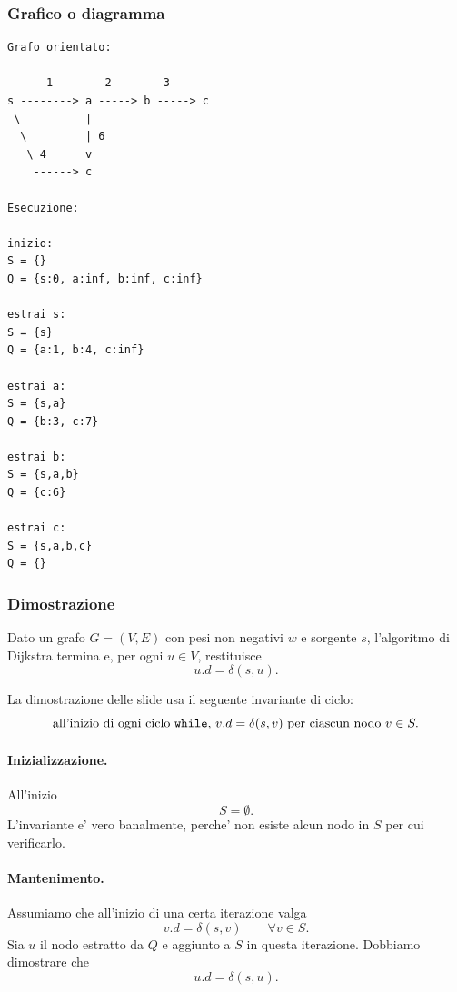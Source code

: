 \subsubsection{Grafico o diagramma}
\begin{center}
\begin{verbatim}
Grafo orientato:

      1        2        3
s --------> a -----> b -----> c
 \          |
  \         | 6
   \ 4      v
    ------> c

Esecuzione:

inizio:
S = {}
Q = {s:0, a:inf, b:inf, c:inf}

estrai s:
S = {s}
Q = {a:1, b:4, c:inf}

estrai a:
S = {s,a}
Q = {b:3, c:7}

estrai b:
S = {s,a,b}
Q = {c:6}

estrai c:
S = {s,a,b,c}
Q = {}
\end{verbatim}
\end{center}

\subsubsection{Dimostrazione}
\begin{teorema}
Dato un grafo $G=(V,E)$ con pesi non negativi $w$ e sorgente $s$, l'algoritmo di Dijkstra termina e, per ogni $u\in V$, restituisce
\[
u.d=\delta(s,u).
\]
\end{teorema}

La dimostrazione delle slide usa il seguente invariante di ciclo:
\[
\text{all'inizio di ogni ciclo \texttt{while}, } v.d=\delta(s,v)
\text{ per ciascun nodo } v\in S.
\]

\paragraph{Inizializzazione.}
All'inizio
\[
S=\emptyset.
\]
L'invariante e' vero banalmente, perche' non esiste alcun nodo in $S$ per cui verificarlo.

\paragraph{Mantenimento.}
Assumiamo che all'inizio di una certa iterazione valga
\[
v.d=\delta(s,v)\qquad\forall v\in S.
\]
Sia $u$ il nodo estratto da $Q$ e aggiunto a $S$ in questa iterazione. Dobbiamo dimostrare che
\[
u.d=\delta(s,u).
\]

